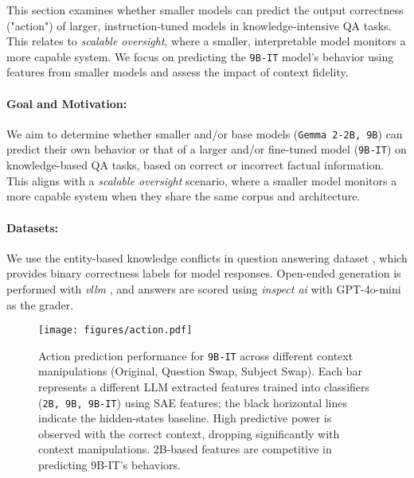 This section examines whether smaller models can predict the output correctness ("action") of larger, instruction-tuned models in knowledge-intensive QA tasks. This relates to \emph{scalable oversight}, where a smaller, interpretable model monitors a more capable system. We focus on predicting the \texttt{9B-IT} model's behavior using features from smaller models and assess the impact of context fidelity.

\paragraph{Goal and Motivation:}
We aim to determine whether smaller and/or base models (\texttt{Gemma 2-2B, 9B}) can predict their own behavior or that of a larger and/or fine-tuned model (\texttt{9B-IT}) on knowledge-based QA tasks, based on correct or incorrect factual information. This aligns with a \emph{scalable oversight} scenario, where a smaller model monitors a more capable system when they share the same corpus and architecture.
\vspace{-0.2em}

\paragraph{Datasets:}
We use the entity-based knowledge conflicts in question answering dataset \cite{longpre2022entitybasedknowledgeconflictsquestion}, which provides binary correctness labels for model responses. Open-ended generation is performed with \emph{vllm} \cite{kwon2023efficient}, and answers are scored using \emph{inspect ai} \cite{UKGovernmentBEIS_inspect_ai} with GPT-4o-mini as the grader.
\vspace{-0.2em}

\begin{figure}[t]
    \centering
    \texttt{[image: figures/action.pdf]}
    \caption{Action prediction performance for \texttt{9B-IT} across different context manipulations (Original, Question Swap, Subject Swap). Each bar represents a different LLM extracted features trained into classifiers (\texttt{2B, 9B, 9B-IT}) using SAE features; the black horizontal lines indicate the hidden-states baseline. High predictive power is observed with the correct context, dropping significantly with context manipulations. 2B-based features are competitive in predicting 9B-IT’s behaviors.}
    \label{fig:action}
\end{figure}
\vspace{-0.2em}

